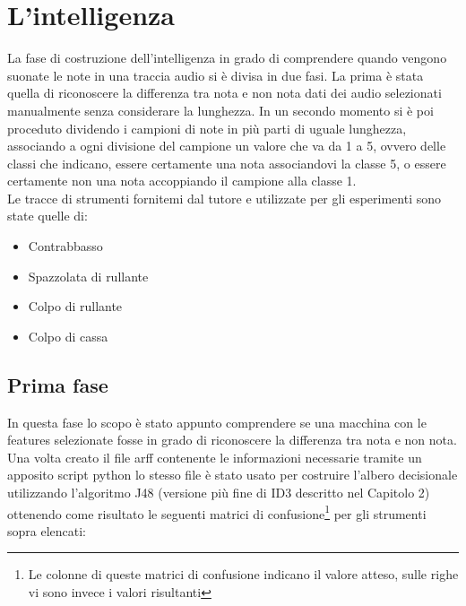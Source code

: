 \chapter{L'intelligenza}
La fase di costruzione dell'intelligenza in grado di comprendere quando vengono suonate le note in una traccia audio si è divisa in due fasi. La prima è stata quella di riconoscere la differenza tra nota e non nota dati dei audio selezionati manualmente senza considerare la lunghezza. In un secondo momento si è poi proceduto dividendo i campioni di note in più parti di uguale lunghezza, associando a ogni divisione del campione un valore che va da 1 a 5, ovvero delle classi che indicano, essere certamente una nota associandovi la classe 5, o essere certamente non una nota accoppiando il campione alla classe 1.\\
Le tracce di strumenti fornitemi dal tutore e utilizzate per gli esperimenti sono state quelle di: 
\begin{itemize}
	\item Contrabbasso
	\item Spazzolata di rullante
	\item Colpo di rullante
	\item Colpo di cassa
\end{itemize}


\section{Prima fase}
In questa fase lo scopo è stato appunto comprendere se una macchina con le features selezionate fosse in grado di riconoscere la differenza tra nota e non nota. Una volta creato il file arff contenente le informazioni necessarie tramite un apposito script python lo stesso file è stato usato per costruire l'albero decisionale utilizzando l'algoritmo J48 (versione più fine di ID3 descritto nel Capitolo 2) ottenendo come risultato le seguenti matrici di confusione\footnote{Le colonne di queste matrici di confusione indicano il valore atteso, sulle righe vi sono invece i valori risultanti} per gli strumenti sopra elencati:\\


